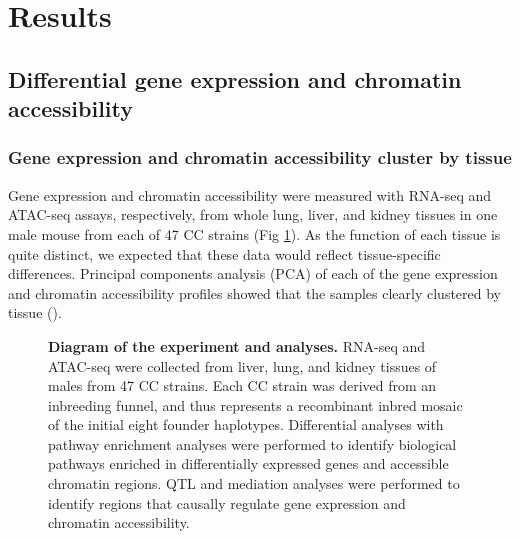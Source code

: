 \documentclass[10pt,letterpaper]{article}
\begin{document}
\section*{Results}
\subsection*{Differential gene expression and chromatin accessibility}

\subsubsection*{Gene expression and chromatin accessibility cluster by tissue}
Gene expression and chromatin accessibility were measured with RNA-seq and ATAC-seq assays, respectively, from whole lung, liver, and kidney tissues in one male mouse from each of 47 CC strains (Fig \ref{fig:overview}). As the function of each tissue is quite distinct, we expected that these data would reflect tissue-specific differences. Principal components analysis (PCA) of each of the gene expression and chromatin accessibility profiles showed that the samples clearly clustered by tissue (). 

\begin{figure}[!h]
\caption{{\bf Diagram of the experiment and analyses.}
RNA-seq and ATAC-seq were collected from liver, lung, and kidney tissues of males from 47 CC strains. Each CC strain was derived from an inbreeding funnel, and thus represents a recombinant inbred mosaic of the initial eight founder haplotypes. Differential analyses with pathway enrichment analyses were performed to identify biological pathways enriched in differentially expressed genes and accessible chromatin regions. QTL and mediation analyses were performed to identify regions that causally regulate gene expression and chromatin accessibility.}\label{fig:overview}
\end{figure}
\end{document}
